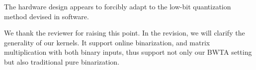 \begin{revcomment}
The hardware design appears to forcibly adapt to the low-bit quantization method devised in software. 
\label{com:5-kernels}
\end{revcomment}
\begin{revresponse}[]

We thank the reviewer for raising this point. In the revision, we will clarify the generality of our kernels. It support online binarization, and matrix multiplication with both binary inputs, thus support not only our BWTA setting but also traditional pure binarization. 


\end{revresponse}
